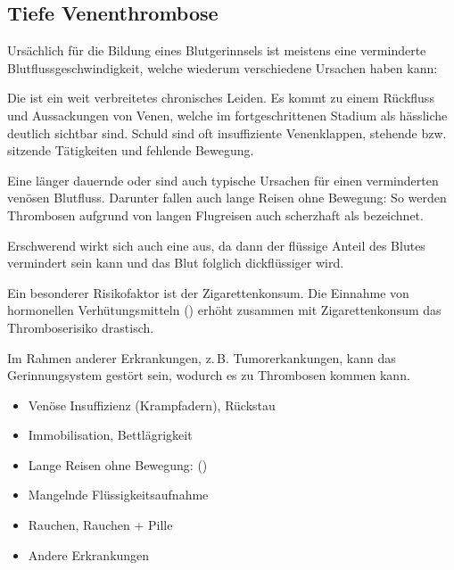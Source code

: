 \subsection{Tiefe Venenthrombose}
\label{topic:venenthrombose}
\label{topic:thrombose}



{%
Ursächlich für die Bildung eines Blutgerinnsels ist meistens
eine verminderte Blutflussgeschwindigkeit, welche wiederum
verschiedene Ursachen haben kann:

Die  ist ein weit verbreitetes
chronisches Leiden.
 Es kommt  zu einem Rückfluss und Aussackungen von
Venen, welche im fortgeschrittenen Stadium als hässliche
 deutlich sichtbar sind. Schuld sind oft
insuffiziente Venenklappen, stehende bzw. sitzende
Tätigkeiten und fehlende Bewegung.

Eine länger dauernde  oder
 sind auch typische Ursachen für einen
verminderten venösen Blutfluss. Darunter fallen auch lange
Reisen ohne Bewegung: So werden Thrombosen aufgrund von
langen Flugreisen auch scherzhaft als  bezeichnet.

Erschwerend wirkt sich auch eine  aus, da dann der flüssige Anteil des
Blutes vermindert sein kann und das Blut folglich
dickflüssiger wird.

Ein besonderer Risikofaktor ist der Zigarettenkonsum. Die
Einnahme von hormonellen Verhütungsmitteln ()
erhöht zusammen mit Zigarettenkonsum das Thromboserisiko
drastisch.

Im Rahmen anderer Erkrankungen, z.\,B. Tumorerkankungen, kann
das Gerinnungsystem gestört sein, wodurch es zu Thrombosen
kommen kann.
}{
\begin{itemize}
  \item Venöse Insuffizienz (Krampfadern), Rückstau
  \item Immobilisation, Bettlägrigkeit
  \item Lange Reisen ohne Bewegung: ()
  \item Mangelnde Flüssigkeitsaufnahme
  \item Rauchen, Rauchen + Pille
  \item Andere Erkrankungen
\end{itemize}
}{}{}{}


